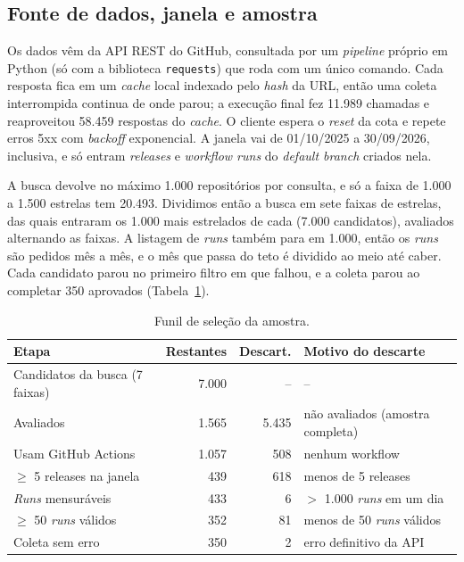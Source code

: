 
\subsection{Fonte de dados, janela e amostra}

Os dados vêm da API REST do GitHub, consultada por um \textit{pipeline} próprio em Python
(só com a biblioteca \texttt{requests}) que roda com um único comando. Cada resposta fica em
um \textit{cache} local indexado pelo \textit{hash} da URL, então uma coleta interrompida
continua de onde parou; a execução final fez 11.989 chamadas e reaproveitou 58.459 respostas
do \textit{cache}. O cliente espera o \textit{reset} da cota e repete erros 5xx com
\textit{backoff} exponencial. A janela vai de 01/10/2025 a 30/09/2026, inclusiva, e só
entram \textit{releases} e \textit{workflow runs} do \textit{default branch} criados nela.

A busca devolve no máximo 1.000 repositórios por consulta, e só a faixa de 1.000 a 1.500
estrelas tem 20.493. Dividimos então a busca em sete faixas de estrelas, das quais entraram
os 1.000 mais estrelados de cada (7.000 candidatos), avaliados alternando as faixas. A
listagem de \textit{runs} também para em 1.000, então os \textit{runs} são pedidos mês a mês,
e o mês que passa do teto é dividido ao meio até caber. Cada candidato parou no primeiro
filtro em que falhou, e a coleta parou ao completar 350 aprovados (Tabela~\ref{tab:funil}).

\begin{table}[ht]
\centering
\caption{Funil de seleção da amostra.}
\label{tab:funil}
\small
\begin{tabular}{lrrl}
\hline
\textbf{Etapa} & \textbf{Restantes} & \textbf{Descart.} & \textbf{Motivo do descarte} \\
\hline
Candidatos da busca (7 faixas) & 7.000 & -- & -- \\
Avaliados                      & 1.565 & 5.435 & não avaliados (amostra completa) \\
Usam GitHub Actions            & 1.057 & 508 & nenhum workflow \\
$\geq$ 5 releases na janela    & 439   & 618 & menos de 5 releases \\
\textit{Runs} mensuráveis      & 433   & 6   & $>$ 1.000 \textit{runs} em um dia \\
$\geq$ 50 \textit{runs} válidos & 352  & 81  & menos de 50 \textit{runs} válidos \\
Coleta sem erro                & 350   & 2   & erro definitivo da API \\
\hline
\end{tabular}
\end{table}

